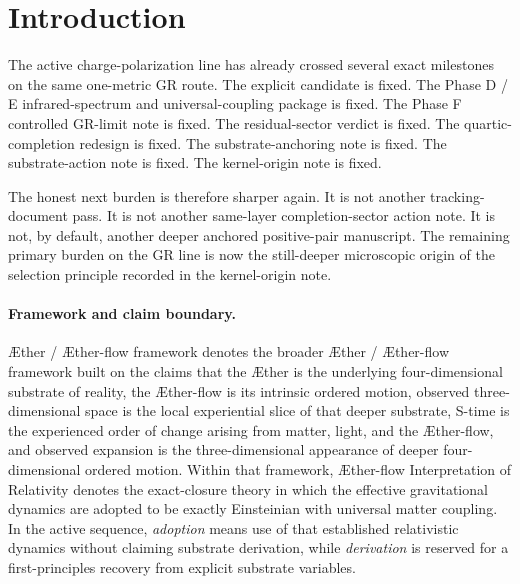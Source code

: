 \documentclass[11pt]{article}
\newcommand{\Aether}{\AE{}ther}
\newcommand{\Aflow}{\AE{}ther-flow}
\newcommand{\TheoryName}{\Aflow{} Interpretation of Relativity}
\newcommand{\TheoryProgram}{\Aether{} / \Aflow{} framework}
\begin{document}
\begin{abstract}
The result is positive but still disciplined. The note supplies a deeper microscopic origin of the current-scope selection principle. It does not claim a final ultraviolet completion of the branch, a uniqueness statement beyond the fixed local two-derivative scope, or a wider theorem than the present one-metric GR claim boundary allows.
\end{abstract}

\section{Introduction}

The active charge-polarization line has already crossed several exact milestones on the same one-metric GR route. The explicit candidate is fixed. The Phase D / E infrared-spectrum and universal-coupling package is fixed. The Phase F controlled GR-limit note is fixed. The residual-sector verdict is fixed. The quartic-completion redesign is fixed. The substrate-anchoring note is fixed. The substrate-action note is fixed. The kernel-origin note is fixed.

The honest next burden is therefore sharper again. It is not another tracking-document pass. It is not another same-layer completion-sector action note. It is not, by default, another deeper anchored positive-pair manuscript. The remaining primary burden on the GR line is now the still-deeper microscopic origin of the selection principle recorded in the kernel-origin note.

\paragraph{Framework and claim boundary.}
\TheoryProgram{} denotes the broader \Aether{} / \Aflow{} framework built on the claims that the \Aether{} is the underlying four-dimensional substrate of reality, the \Aflow{} is its intrinsic ordered motion, observed three-dimensional space is the local experiential slice of that deeper substrate, S-time is the experienced order of change arising from matter, light, and the \Aflow{}, and observed expansion is the three-dimensional appearance of deeper four-dimensional ordered motion. Within that framework, \TheoryName{} denotes the exact-closure theory in which the effective gravitational dynamics are adopted to be exactly Einsteinian with universal matter coupling. In the active sequence, \emph{adoption} means use of that established relativistic dynamics without claiming substrate derivation, while \emph{derivation} is reserved for a first-principles recovery from explicit substrate variables.
\end{document}
